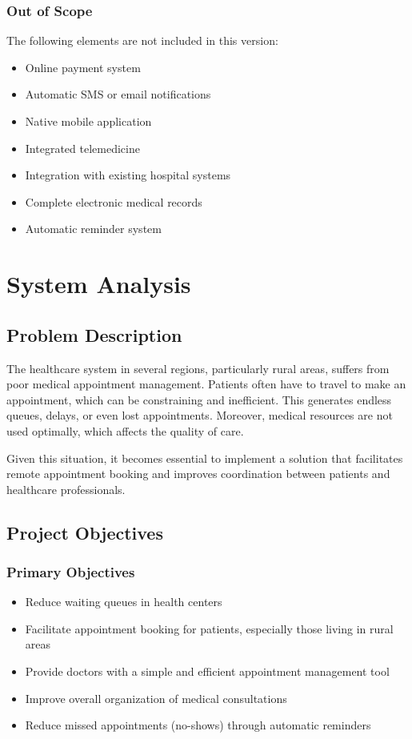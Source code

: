 \documentclass[12pt,a4paper]{report}
\begin{document}
\subsection{Out of Scope}
The following elements are not included in this version:
\begin{itemize}
    \item Online payment system
    \item Automatic SMS or email notifications
    \item Native mobile application
    \item Integrated telemedicine
    \item Integration with existing hospital systems
    \item Complete electronic medical records
    \item Automatic reminder system
\end{itemize}

\chapter{System Analysis}

\section{Problem Description}

The healthcare system in several regions, particularly rural areas, suffers from poor medical appointment management. Patients often have to travel to make an appointment, which can be constraining and inefficient. This generates endless queues, delays, or even lost appointments. Moreover, medical resources are not used optimally, which affects the quality of care.

Given this situation, it becomes essential to implement a solution that facilitates remote appointment booking and improves coordination between patients and healthcare professionals.

\section{Project Objectives}

\subsection{Primary Objectives}
\begin{itemize}
    \item Reduce waiting queues in health centers
    \item Facilitate appointment booking for patients, especially those living in rural areas
    \item Provide doctors with a simple and efficient appointment management tool
    \item Improve overall organization of medical consultations
    \item Reduce missed appointments (no-shows) through automatic reminders
\end{itemize}
\end{document}
